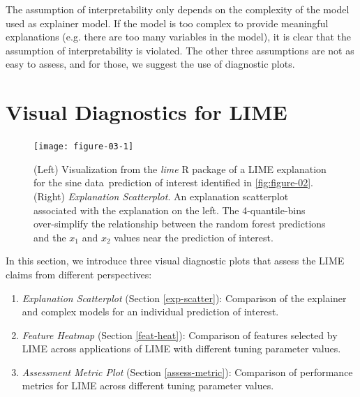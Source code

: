 \documentclass[AMS,STIX2COL]{WileyNJD-v2}\usepackage[]{graphicx}\usepackage[]{color}
\newenvironment{knitrout}{}{} %
\newcommand{\data}{sine data}
\renewcommand{\sout}[1]{\unskip}
\begin{document}
The assumption of interpretability only depends on the complexity of the model used as explainer model. If the model is too complex to provide meaningful explanations (e.g. there are too many variables in the model), it is clear that the assumption of interpretability is violated. The other three assumptions are not as easy to assess, and for those, we suggest the use of diagnostic plots.

\section{Visual Diagnostics for LIME} \label{diagnostics}







\begin{figure}[!thp]
\begin{knitrout}
\color{fgcolor}

{\centering \texttt{[image: figure-03-1]} 

}



\end{knitrout}
\caption{(Left) Visualization from the \emph{lime} R package of a LIME explanation for the \data \ prediction of interest identified in \autoref{fig:figure-02}. (Right) \emph{Explanation Scatterplot}.  An explanation scatterplot associated with the explanation on the left. The 4-quantile-bins over-simplify the relationship between the random forest predictions and the $x_1$ and $x_2$ values near the prediction of interest.}
\label{fig:figure-03}
\end{figure}

In this section, we introduce three visual diagnostic plots that assess the LIME claims from different perspectives:

\begin{enumerate}
\item \emph{Explanation Scatterplot} (Section \ref{exp-scatter}): Comparison of the explainer and complex models for an individual prediction of interest.
\item \emph{Feature Heatmap} (Section \ref{feat-heat}): Comparison of features selected by LIME across applications of LIME with different tuning parameter values.
\item \emph{Assessment Metric Plot} (Section \ref{assess-metric}): Comparison of performance metrics for LIME across \sout{applications of LIME with} different tuning parameter values. 
\end{enumerate}
\end{document}

